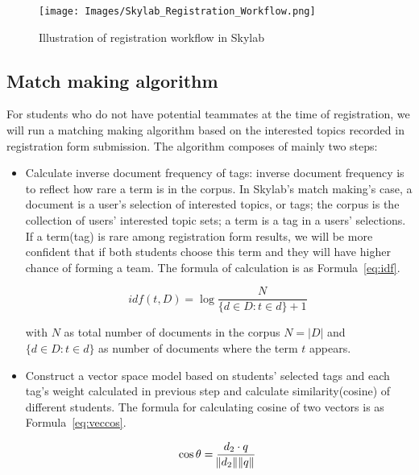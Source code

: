 \begin{figure}[h]
  \centering
  \texttt{[image: Images/Skylab\_Registration\_Workflow.png]}
  \caption{Illustration of registration workflow in Skylab}
  \label{fig:RegistrationWorkflow}
\end{figure}

\subsection{Match making algorithm}

For students who do not have potential teammates at the time of registration, we will run a matching making algorithm based on the interested topics recorded in registration form submission. The algorithm composes of mainly two steps:

\begin{itemize}
  \item Calculate inverse document frequency of tags: inverse document frequency is to reflect how rare a term is in the corpus\cite{citationir}. In Skylab's match making's case, a document is a user's selection of interested topics, or tags; the corpus is the collection of users' interested topic sets; a term is a tag in a users' selections. If a term(tag) is rare among registration form results, we will be more confident that if both students choose this term and they will have higher chance of forming a team. The formula of calculation is as Formula~\ref{eq:idf}.

  \begin{equation}
    idf(t,D) = \log \frac{N}{\{ d \in D : t \in d \} + 1} \
    \label{eq:idf}
  \end{equation}
  
  with \(N\) as total number of documents in the corpus \( N = |D| \) and \(\{ d \in D : t \in d \}\) as number of documents where the term \(t\) appears\cite{citationir}.

  \item Construct a vector space model based on students' selected tags and each tag's weight calculated in previous step and calculate similarity(cosine) of different students. The formula for calculating cosine of two vectors is as Formula~\ref{eq:veccos}\cite{citationvecspacemodel}.

  \begin{equation}
    \cos\theta  = \frac{d_2 \cdot q}{ \norm{d_2} \norm{q} } \
    \label{eq:veccos}
  \end{equation}


\end{itemize}
